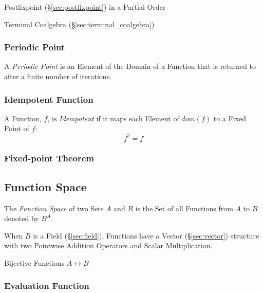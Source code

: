 Postfixpoint (\S\ref{sec:postfixpoint}) in a Partial Order

Terminal Coalgebra (\S\ref{sec:terminal_coalgebra})



\subsubsection{Periodic Point}\label{sec:periodic_point}

A \emph{Periodic Point} is an Element of the Domain of a Function that
is returned to after a finite number of iterations.



\subsubsection{Idempotent Function}\label{sec:idempotent}

A Function, $f$, is \emph{Idempotent} if it maps each Element of
$dom(f)$ to a Fixed Point of $f$:
\[
  f^2 = f
\]



\subsubsection{Fixed-point Theorem}\label{sec:fixedpoint_theorem}



\subsection{Function Space}\label{sec:function_space}

The \emph{Function Space} of two Sets $A$ and $B$ is the Set of all
Functions from $A$ to $B$ denoted by $B^A$.

When $B$ is a Field (\S\ref{sec:field}), Functions have a Vector
(\S\ref{sec:vector}) structure with two Pointwise Addition Operators
and Scalar Multiplication. %

Bijective Functions $A \leftrightarrow B$



\subsubsection{Evaluation Function}\label{sec:evaluation_function}

